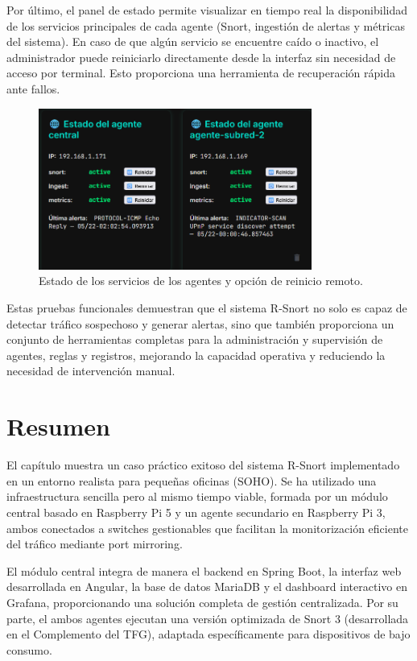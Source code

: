 \documentclass[11pt,a4paper,twoside]{report}
\begin{document}
Por último, el panel de estado permite visualizar en tiempo real la disponibilidad de los servicios principales de cada agente (Snort, ingestión de alertas y métricas del sistema). En caso de que algún servicio se encuentre caído o inactivo, el administrador puede reiniciarlo directamente desde la interfaz sin necesidad de acceso por terminal. Esto proporciona una herramienta de recuperación rápida ante fallos.

\begin{figure}[H]
	\centering
	\includegraphics[width=0.8\textwidth]{pruebas/9.png}
	\caption{Estado de los servicios de los agentes y opción de reinicio remoto.}
	\label{fig:estado_servicios_agentes}
\end{figure}

Estas pruebas funcionales demuestran que el sistema R-Snort no solo es capaz de detectar tráfico sospechoso y generar alertas, sino que también proporciona un conjunto de herramientas completas para la administración y supervisión de agentes, reglas y registros, mejorando la capacidad operativa y reduciendo la necesidad de intervención manual.

\section{Resumen}

El capítulo muestra un caso práctico exitoso del sistema R-Snort implementado en un entorno realista para pequeñas oficinas (SOHO). Se ha utilizado una infraestructura sencilla pero al mismo tiempo viable, formada por un módulo central basado en Raspberry Pi 5 y un agente secundario en Raspberry Pi 3, ambos conectados a switches gestionables que facilitan la monitorización eficiente del tráfico mediante port mirroring.\newline

El módulo central integra de manera el backend en Spring Boot, la interfaz web desarrollada en Angular, la base de datos MariaDB y el dashboard interactivo en Grafana, proporcionando una solución completa de gestión centralizada. Por su parte, el ambos agentes ejecutan una versión optimizada de Snort 3 (desarrollada en el Complemento del TFG), adaptada específicamente para dispositivos de bajo consumo.\newline
\end{document}
